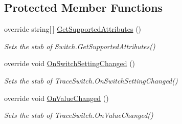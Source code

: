 \subsection*{Protected Member Functions}
\begin{DoxyCompactItemize}
\item 
override string\mbox{[}$\,$\mbox{]} \hyperlink{class_system_1_1_diagnostics_1_1_fakes_1_1_stub_trace_switch_a0dc2227bf6af8f9c45978b9e6753feb0}{Get\-Supported\-Attributes} ()
\begin{DoxyCompactList}\small\item\em Sets the stub of Switch.\-Get\-Supported\-Attributes()\end{DoxyCompactList}\item 
override void \hyperlink{class_system_1_1_diagnostics_1_1_fakes_1_1_stub_trace_switch_a0f704ebbb220e1ef293b0ef7e153abd7}{On\-Switch\-Setting\-Changed} ()
\begin{DoxyCompactList}\small\item\em Sets the stub of Trace\-Switch.\-On\-Switch\-Setting\-Changed()\end{DoxyCompactList}\item 
override void \hyperlink{class_system_1_1_diagnostics_1_1_fakes_1_1_stub_trace_switch_abb5acacde9e3a1d1f0632a7bbbd42569}{On\-Value\-Changed} ()
\begin{DoxyCompactList}\small\item\em Sets the stub of Trace\-Switch.\-On\-Value\-Changed()\end{DoxyCompactList}\end{DoxyCompactItemize}
